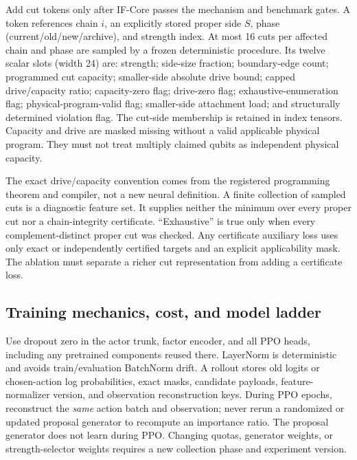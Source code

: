 \documentclass[11pt,a4paper]{article}
\theoremstyle{definition}\newtheorem{definition}[proposition]{Definition}
\begin{document}
Add cut tokens only after IF-Core passes the mechanism and benchmark gates. A token references chain \(i\), an explicitly stored proper side \(S\), phase (current/old/new/archive), and strength index. At most 16 cuts per affected chain and phase are sampled by a frozen deterministic procedure. Its twelve scalar slots (width 24) are: strength; side-size fraction; boundary-edge count; programmed cut capacity; smaller-side absolute drive bound; capped drive/capacity ratio; capacity-zero flag; drive-zero flag; exhaustive-enumeration flag; physical-program-valid flag; smaller-side attachment load; and structurally determined violation flag. The cut-side membership is retained in index tensors. Capacity and drive are masked missing without a valid applicable physical program. They must not treat multiply claimed qubits as independent physical capacity.

The exact drive/capacity convention comes from the registered programming theorem and compiler, not a new neural definition. A finite collection of sampled cuts is a diagnostic feature set. It supplies neither the minimum over every proper cut nor a chain-integrity certificate. ``Exhaustive'' is true only when every complement-distinct proper cut was checked. Any certificate auxiliary loss uses only exact or independently certified targets and an explicit applicability mask. The ablation must separate a richer cut representation from adding a certificate loss.

\subsection{Training mechanics, cost, and model ladder}

Use dropout zero in the actor trunk, factor encoder, and all PPO heads, including any pretrained components reused there. LayerNorm is deterministic and avoids train/evaluation BatchNorm drift. A rollout stores old logits or chosen-action log probabilities, exact masks, candidate payloads, feature-normalizer version, and observation reconstruction keys. During PPO epochs, reconstruct the \emph{same} action batch and observation; never rerun a randomized or updated proposal generator to recompute an importance ratio. The proposal generator does not learn during PPO. Changing quotas, generator weights, or strength-selector weights requires a new collection phase and experiment version.
\end{document}
